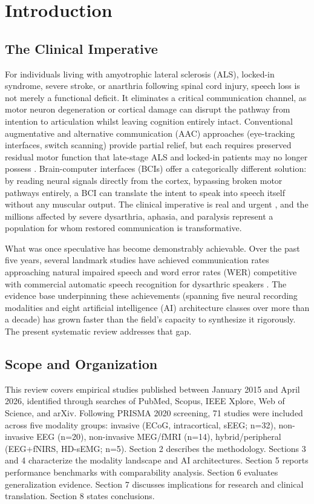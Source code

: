 \documentclass[11pt,a4paper]{article}
\begin{document}
\section{Introduction}

\subsection{The Clinical Imperative}

For individuals living with amyotrophic lateral sclerosis (ALS), locked-in syndrome, severe stroke, or anarthria following spinal cord injury, speech loss is not merely a functional deficit. It eliminates a critical communication channel, as motor neuron degeneration or cortical damage can disrupt the pathway from intention to articulation whilst leaving cognition entirely intact. Conventional augmentative and alternative communication (AAC) approaches (eye-tracking interfaces, switch scanning) provide partial relief, but each requires preserved residual motor function that late-stage ALS and locked-in patients may no longer possess \cite{TaskForce2010}. Brain-computer interfaces (BCIs) offer a categorically different solution: by reading neural signals directly from the cortex, bypassing broken motor pathways entirely, a BCI can translate the intent to speak into speech itself without any muscular output. The clinical imperative is real and urgent \cite{TaskForce2010}, and the millions affected by severe dysarthria, aphasia, and paralysis represent a population for whom restored communication is transformative.

What was once speculative has become demonstrably achievable. Over the past five years, several landmark studies have achieved communication rates approaching natural impaired speech and word error rates (WER) competitive with commercial automatic speech recognition for dysarthric speakers \cite{Moses2021,Willett2023,Card2024,Metzger2023}. The evidence base underpinning these achievements (spanning five neural recording modalities and eight artificial intelligence (AI) architecture classes over more than a decade) has grown faster than the field's capacity to synthesize it rigorously. The present systematic review addresses that gap.

\subsection{Scope and Organization}

This review covers empirical studies published between January 2015 and April 2026, identified through searches of PubMed, Scopus, IEEE Xplore, Web of Science, and arXiv. Following PRISMA 2020 screening, 71 studies were included across five modality groups: invasive (ECoG, intracortical, sEEG; n=32), non-invasive EEG (n=20), non-invasive MEG/fMRI (n=14), hybrid/peripheral (EEG+fNIRS, HD-sEMG; n=5). Section 2 describes the methodology. Sections 3 and 4 characterize the modality landscape and AI architectures. Section 5 reports performance benchmarks with comparability analysis. Section 6 evaluates generalization evidence. Section 7 discusses implications for research and clinical translation. Section 8 states conclusions.
\end{document}
